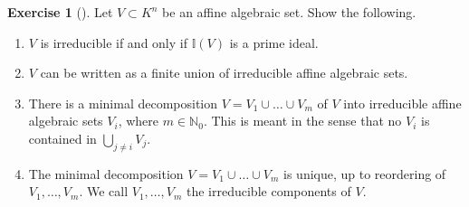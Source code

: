 \documentclass[reqno]{amsart}
\theoremstyle{definition}
\newtheorem{exercise}[theorem]{Exercise}
\theoremstyle{remark}
\begin{document}
    \begin{exercise}[]
        Let $V \subset K^{n}$ be an affine
        algebraic set. Show the following.
        \begin{enumerate}
            \item $V$ is irreducible if and only if
                $\mathbb{I}(V)$ is a prime ideal.
            \item $V$ can be written as a finite
                union of irreducible affine algebraic
                sets.
            \item There is a minimal decomposition
                $V = V_1 \cup \ldots \cup 
                V_m$ of $V$ into irreducible affine
                algebraic sets $V_i$, where
                $m \in \mathbb{N}_0$. This is meant in the
                sense that no $V_i$ is contained in
                $\bigcup_{j \neq i} V_j$.
            \item The minimal decomposition $V = 
                V_1 \cup \ldots \cup V_m$ is unique,
                up to reordering of 
                $V_1,\ldots, V_m$. We
                call $V_1, \ldots, V_m$ the irreducible
                components of $V$.
        \end{enumerate}
    \end{exercise}
\end{document}
